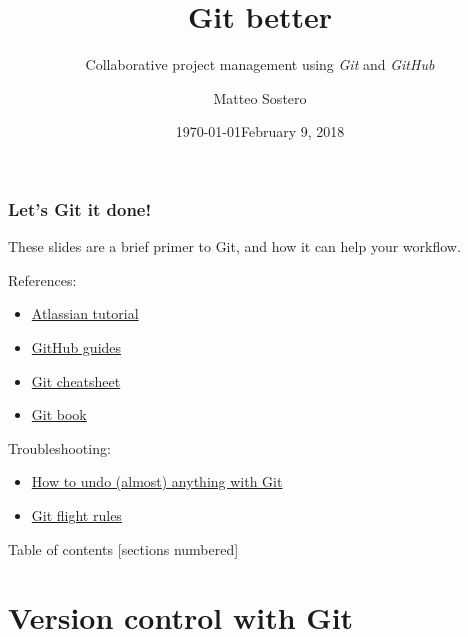\documentclass[10pt,svgnames]{beamer}
\title{Git better}
\subtitle{Collaborative project management using \emph{Git} and \emph{GitHub}}
\date{\today}
\author{Matteo Sostero}
\institute{Sant'Anna School of Advanced Studies}
\date{February 9, 2018} %
\begin{document}
\maketitle

\begin{frame}
\frametitle{Let's Git it done!}
    
These slides are a brief primer to Git, and how it can help your workflow.



\bigskip
\pause

References:
\begin{itemize}
  \item \href{https://www.atlassian.com/git/tutorials}{Atlassian tutorial}
  \item \href{https://guides.github.com/}{GitHub guides}
  \item \href{http://ndpsoftware.com/git-cheatsheet.html}{Git cheatsheet}
  \item \href{https://git-scm.com/book/en/v2}{Git book}
\end{itemize}
\medskip

Troubleshooting:
\begin{itemize}
  \item \href{https://github.com/blog/2019-how-to-undo-almost-anything-with-git}{How to undo (almost) anything with Git}
  \item \href{https://github.com/k88hudson/git-flight-rules/blob/master/README.md}{Git flight rules}
\end{itemize}
\end{frame}

\begin{frame}{Table of contents}
[sections numbered]
\tableofcontents[hideallsubsections]
\end{frame}


\section{Version control with Git}
\end{document}
